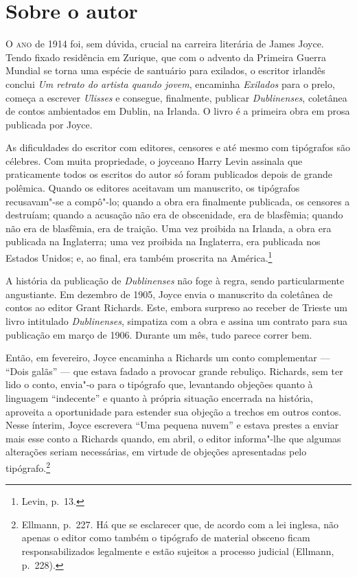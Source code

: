 
\section{Sobre o autor}

\textsc{O ano} de 1914 foi, sem dúvida, crucial na carreira literária de James
Joyce. Tendo fixado residência em Zurique, que com o advento da Primeira Guerra
Mundial se torna uma espécie de santuário para exilados, o escritor irlandês
conclui \textit{Um retrato do artista quando jovem}, encaminha \textit{Exilados} para o
prelo, começa a escrever \textit{Ulisses} e consegue, finalmente, publicar
\textit{Dublinenses}, coletânea de contos ambientados em Dublin, na Irlanda. O
livro é a primeira obra em prosa publicada por Joyce.

As dificuldades do escritor com editores, censores e até mesmo com tipógrafos
são célebres. Com muita propriedade, o joyceano Harry Levin assinala que
praticamente todos os escritos do autor só foram publicados depois de grande
polêmica. Quando os editores aceitavam um manuscrito, os tipógrafos
recusavam"-se a compô"-lo; quando a obra era finalmente publicada, os censores a
destruíam; quando a acusação não era de obscenidade, era de blasfêmia; quando
não era de blasfêmia, era de traição.  Uma vez proibida na Irlanda, a obra era
publicada na Inglaterra; uma vez proibida na Inglaterra, era publicada nos
Estados Unidos; e, ao final, era também proscrita na América.\footnote{ Levin, p.~13.}


A história da publicação de \textit{Dublinenses} não foge à regra, sendo
particularmente angustiante. Em dezembro de 1905, Joyce envia o manuscrito da
coletânea de contos ao editor Grant Richards. Este, embora surpreso ao receber
de Trieste um livro intitulado \textit{Dublinenses}, simpatiza com a obra e
assina um contrato para sua publicação em março de 1906. Durante um mês, tudo
parece correr bem.

Então, em fevereiro, Joyce encaminha a Richards um conto complementar --- “Dois
galãs” --- que estava fadado a provocar grande rebuliço. Richards, sem ter lido o
conto, envia"-o para o tipógrafo que, levantando objeções quanto à linguagem
“indecente” e quanto à própria situação encerrada na história, aproveita a
oportunidade para estender sua objeção a trechos em outros contos. Nesse
ínterim, Joyce escrevera “Uma pequena nuvem” e estava prestes a enviar mais
esse conto a Richards quando, em abril, o editor informa"-lhe que algumas
alterações seriam necessárias, em virtude de objeções apresentadas pelo
tipógrafo.\footnote{  Ellmann, p.~227. Há que se esclarecer que, de acordo com a
lei inglesa, não apenas o editor como também o tipógrafo de material obsceno
ficam responsabilizados legalmente e estão sujeitos a processo judicial
(Ellmann, p.~228).}

